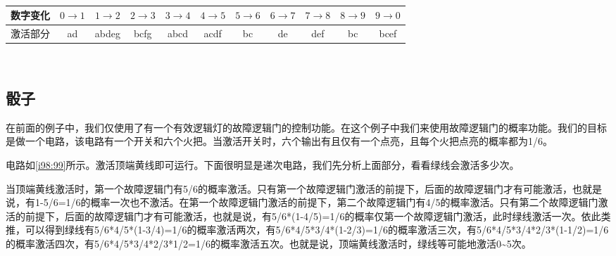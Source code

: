\begin{figure}[!h]
\begin{center}
\end{center}
\caption{}
\label{i110:112}
\end{figure}

\begin{table}[h]
\centering
\begin{tabular}{c||c|c|c|c|c|c|c|c|c|c}
数字变化&$0\rightarrow 1$&$1\rightarrow 2$&$2\rightarrow 3$&$3\rightarrow 4$&$4\rightarrow 5$&$5\rightarrow 6$&$6\rightarrow 7$&$7\rightarrow 8$&$8\rightarrow 9$&$9\rightarrow 0$\\
\hline
激活部分&ad&abdeg&bcfg&abcd&acdf&bc&de&def&bc&bcef
\end{tabular}
\caption{}
\label{jishuqi}
\end{table}

\begin{figure}[!h]
\begin{center}
\\
\end{center}
\caption{}
\label{i113:114}
\end{figure}

\subsection{骰子}

在前面的例子中，我们仅使用了有一个有效逻辑灯的故障逻辑门的控制功能。在这个例子中我们来使用故障逻辑门的概率功能。我们的目标是做一个电路，该电路有一个开关和六个火把。当激活开关时，六个输出有且仅有一个点亮，且每个火把点亮的概率都为1/6。

电路如\autoref{i98:99}所示。激活顶端黄线即可运行。下面很明显是递次电路，我们先分析上面部分，看看绿线会激活多少次。

\begin{figure}[!h]
\begin{center}
\end{center}
\caption{}
\label{i98:99}
\end{figure}

当顶端黄线激活时，第一个故障逻辑门有5/6的概率激活。只有第一个故障逻辑门激活的前提下，后面的故障逻辑门才有可能激活，也就是说，有1-5/6=1/6的概率一次也不激活。在第一个故障逻辑门激活的前提下，第二个故障逻辑门有4/5的概率激活。只有第二个故障逻辑门激活的前提下，后面的故障逻辑门才有可能激活，也就是说，有5/6*(1-4/5)=1/6的概率仅第一个故障逻辑门激活，此时绿线激活一次。依此类推，可以得到绿线有5/6*4/5*(1-3/4)=1/6的概率激活两次，有5/6*4/5*3/4*(1-2/3)=1/6的概率激活三次，有5/6*4/5*3/4*2/3*(1-1/2)=1/6的概率激活四次，有5/6*4/5*3/4*2/3*1/2=1/6的概率激活五次。也就是说，顶端黄线激活时，绿线等可能地激活0\~{}5次。

